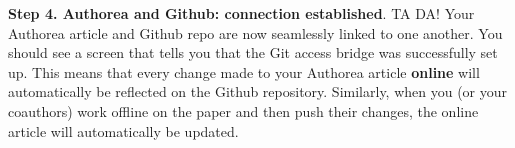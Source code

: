 \textbf{Step 4. Authorea and Github: connection established}. TA DA! Your Authorea article and Github repo are now seamlessly linked to one another. You should see a screen that tells you that the Git access bridge was successfully set up. This means that every change made to your Authorea article \textbf{online} will automatically be reflected on the Github repository. Similarly, when you (or your coauthors) work offline on the paper and then push their changes, the online article will automatically be updated. 